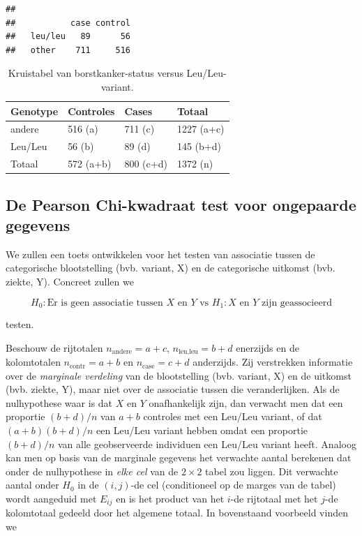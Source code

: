 \documentclass[
  12pt,dutch]{book}
\theoremstyle{definition}
\theoremstyle{definition}
\theoremstyle{definition}
\theoremstyle{definition}
\theoremstyle{remark}
\begin{document}
\begin{verbatim}
##          
##           case control
##   leu/leu   89      56
##   other    711     516
\end{verbatim}

\begin{table}

\caption{\label{tab:leu4}Kruistabel van borstkanker-status versus Leu/Leu-variant.}
\centering
\begin{tabular}[t]{llll}
\toprule
Genotype & Controles & Cases & Totaal\\
\midrule
andere & 516 (a) & 711 (c) & 1227 (a+c)\\
Leu/Leu & 56 (b) & 89 (d) & 145 (b+d)\\
Totaal & 572 (a+b) & 800 (c+d) & 1372 (n)\\
\bottomrule
\end{tabular}
\end{table}

\subsection{De Pearson Chi-kwadraat test voor ongepaarde gegevens}\label{de-pearson-chi-kwadraat-test-voor-ongepaarde-gegevens}

We zullen een toets ontwikkelen voor het testen van associatie tussen de categorische blootstelling (bvb. variant, X) en de categorische uitkomst (bvb. ziekte, Y).
Concreet zullen we

\[H_0: \text{Er is geen associatie tussen } X \text{ en } Y \text{ vs } H_1: X \text{ en } Y \text{ zijn geassocieerd}\]

testen.

Beschouw de rijtotalen \(n_\text{andere}=a+c\), \(n_\text{leu,leu}=b+d\) enerzijds en de kolomtotalen \(n_\text{contr}=a+b\) en \(n_\text{case}=c+d\) anderzijds. Zij verstrekken informatie
over de \emph{marginale verdeling} van de blootstelling (bvb. variant, X) en de uitkomst (bvb. ziekte, Y),
maar niet over de associatie tussen die veranderlijken. Als de nulhypothese
waar is dat \(X\) en \(Y\) onafhankelijk zijn, dan verwacht men dat een proportie \((b+d)/n\)
van \(a+b\) controles met een Leu/Leu variant, of dat \((a+b)(b+d)/n\) een Leu/Leu variant hebben omdat een proportie \((b+d)/n\) van alle geobserveerde individuen een Leu/Leu variant heeft.
Analoog kan men op basis van de marginale gegevens het verwachte aantal berekenen dat onder de nulhypothese in \emph{elke cel} van de \(2\times 2\) tabel zou liggen.
Dit verwachte aantal onder \(H_0\) in de \((i,j)\)-de cel (conditioneel op de marges van de tabel) wordt aangeduid met \(E_{ij}\) en is het product
van het \(i\)-de rijtotaal met het \(j\)-de kolomtotaal gedeeld door het
algemene totaal. In bovenstaand voorbeeld vinden we
\end{document}
